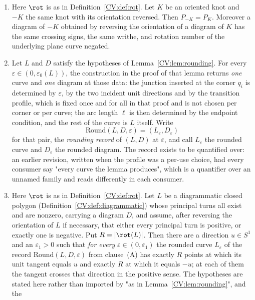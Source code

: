 \begin{theorem}\label{CV:thm:carrierfloor}\leanok
\begin{enumerate}
\item[(R)] Here $\rot$ is as in Definition~\ref{CV:def:rot}.
Let $K$ be an oriented knot and $-K$ the same knot with its orientation
reversed. Then $P_{-K}=P_{K}$. Moreover a diagram of $-K$ obtained by reversing
the orientation of a diagram of $K$ has the same crossing signs, the same
writhe, and rotation number of the underlying plane curve negated.
\item[(A)] Let $L$ and $D$ satisfy the hypotheses of Lemma~\ref{CV:lem:rounding}. For every
$\varepsilon\in(0,\varepsilon_0(L))$, the construction in the proof of that
lemma returns \emph{one} curve and \emph{one} diagram at those data: the
junction inserted at the corner $q_i$ is determined by $\varepsilon$, by the
two incident unit directions and by the transition profile, which is fixed once
and for all in that proof and is not chosen per corner or per curve; the arc
length $\ell$ is then determined by the endpoint condition, and the rest of the
curve is $L$ itself. Write
\[
   \mathrm{Round}(L,D,\varepsilon)=(L_\varepsilon,D_\varepsilon)
\]
for that pair, the \emph{rounding record} of $(L,D)$ at $\varepsilon$, and call
$L_\varepsilon$ the rounded curve and $D_\varepsilon$ the rounded diagram. The
record exists to be quantified over: an earlier revision, written when the
profile was a per-use choice, had every consumer say "every curve the lemma
produces", which is a quantifier over an unnamed family and reads differently
in each consumer.
\item[(B)] Here $\rot$ is as in Definition~\ref{CV:def:rot}.
Let $L$ be a diagrammatic closed polygon (Definition~\ref{CV:def:diagrammatic})
whose principal turns all exist and are nonzero, carrying a diagram $D$, and
assume, after reversing the orientation of $L$ if necessary, that either every
principal turn is positive, or exactly one is negative. Put $R=|\rot(L)|$. Then
there are a direction $u\in S^1$ and an $\varepsilon_1>0$ such that \emph{for
every} $\varepsilon\in(0,\varepsilon_1)$ the rounded curve $L_\varepsilon$ of
the record $\mathrm{Round}(L,D,\varepsilon)$
from clause~(A) has exactly $R$ points at which its unit
tangent equals $u$ and exactly $R$ at which it equals $-u$; at each of them the
tangent crosses that direction in the positive sense. The hypotheses are stated
here rather than imported by "as in Lemma~\ref{CV:lem:rounding}", and the

\end{enumerate}
\end{theorem}
